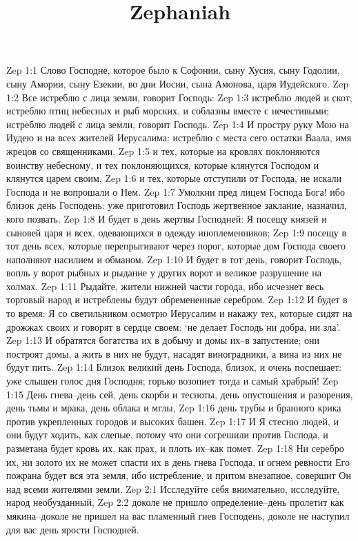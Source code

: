 

\title{Zephaniah}

Zep 1:1  Слово Господне, которое было к Софонии, сыну Хусия, сыну Годолии, сыну Амории, сыну Езекии, во дни Иосии, сына Амонова, царя Иудейского.
Zep 1:2  Все истреблю с лица земли, говорит Господь:
Zep 1:3  истреблю людей и скот, истреблю птиц небесных и рыб морских, и соблазны вместе с нечестивыми; истреблю людей с лица земли, говорит Господь.
Zep 1:4  И простру руку Мою на Иудею и на всех жителей Иерусалима: истреблю с места сего остатки Ваала, имя жрецов со священниками,
Zep 1:5  и тех, которые на кровлях поклоняются воинству небесному, и тех поклоняющихся, которые клянутся Господом и клянутся царем своим,
Zep 1:6  и тех, которые отступили от Господа, не искали Господа и не вопрошали о Нем.
Zep 1:7  Умолкни пред лицем Господа Бога! ибо близок день Господень: уже приготовил Господь жертвенное заклание, назначил, кого позвать.
Zep 1:8  И будет в день жертвы Господней: Я посещу князей и сыновей царя и всех, одевающихся в одежду иноплеменников;
Zep 1:9  посещу в тот день всех, которые перепрыгивают через порог, которые дом Господа своего наполняют насилием и обманом.
Zep 1:10  И будет в тот день, говорит Господь, вопль у ворот рыбных и рыдание у других ворот и великое разрушение на холмах.
Zep 1:11  Рыдайте, жители нижней части города, ибо исчезнет весь торговый народ и истреблены будут обремененные серебром.
Zep 1:12  И будет в то время: Я со светильником осмотрю Иерусалим и накажу тех, которые сидят на дрожжах своих и говорят в сердце своем: `не делает Господь ни добра, ни зла'.
Zep 1:13  И обратятся богатства их в добычу и домы их--в запустение; они построят домы, а жить в них не будут, насадят виноградники, а вина из них не будут пить.
Zep 1:14  Близок великий день Господа, близок, и очень поспешает: уже слышен голос дня Господня; горько возопиет тогда и самый храбрый!
Zep 1:15  День гнева--день сей, день скорби и тесноты, день опустошения и разорения, день тьмы и мрака, день облака и мглы,
Zep 1:16  день трубы и бранного крика против укрепленных городов и высоких башен.
Zep 1:17  И Я стесню людей, и они будут ходить, как слепые, потому что они согрешили против Господа, и разметана будет кровь их, как прах, и плоть их--как помет.
Zep 1:18  Ни серебро их, ни золото их не может спасти их в день гнева Господа, и огнем ревности Его пожрана будет вся эта земля, ибо истребление, и притом внезапное, совершит Он над всеми жителями земли.
Zep 2:1  Исследуйте себя внимательно, исследуйте, народ необузданный,
Zep 2:2  доколе не пришло определение--день пролетит как мякина--доколе не пришел на вас пламенный гнев Господень, доколе не наступил для вас день ярости Господней.
